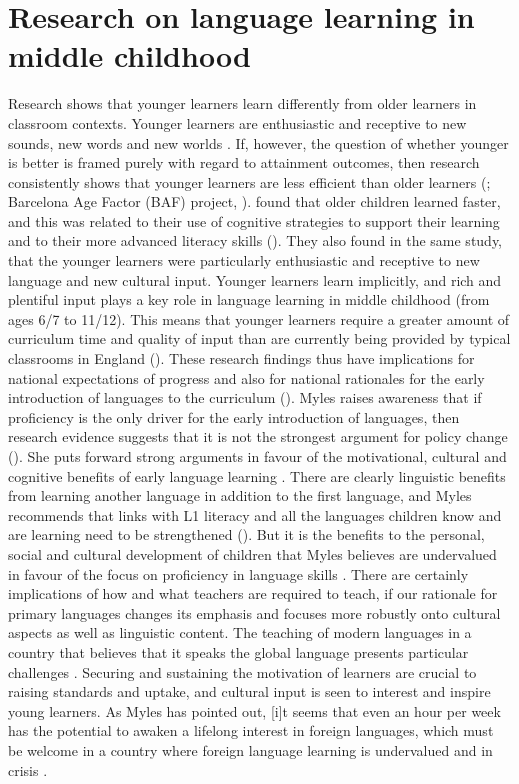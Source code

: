 \documentclass[output=paper]{langscibook}
\begin{document}
\section{Research on language learning in middle childhood}
\begin{sloppypar}
Research shows that younger learners learn differently from older learners in classroom contexts. Younger learners are enthusiastic and receptive to new sounds, new words and new worlds \citep{Myles2017}. If, however, the question of whether younger is better is framed purely with regard to attainment outcomes, then research consistently shows that younger learners are less efficient than older learners (\citealt{MylesMitchell2012}; Barcelona Age Factor (BAF) project, \citealt{Munoz2006}). \citet{MylesMitchell2012} found that older children learned faster, and this was related to their use of cognitive strategies to support their learning and to their more advanced literacy skills (\citealt{MylesMitchell2012,Myles2017}). They also found in the same study, that the younger learners were particularly enthusiastic and receptive to new language and new cultural input. Younger learners learn implicitly, and rich and plentiful input plays a key role in language learning in middle childhood (from ages 6/7 to 11/12). This means that younger learners require a greater amount of curriculum time and quality of input than are currently being provided by typical classrooms in England (\citealt{HolmesMyles2019}). These research findings thus have implications for national expectations of progress and also for national rationales for the early introduction of languages to the curriculum (\citealt{MitchellMyles2019}). Myles raises awareness that if proficiency is the only driver for the early introduction of languages, then research evidence suggests that it is not the strongest argument for policy change (\citealt{Myles2017,MitchellMyles2019}). She puts forward strong arguments in favour of the motivational, cultural and cognitive benefits of early language learning \citep{Myles2020}. There are clearly linguistic benefits from learning another language in addition to the first language, and Myles recommends that links with L1 literacy and all the languages children know and are learning need to be strengthened (\citealt[10]{HolmesMyles2019}). But it is the benefits to the personal, social and cultural development of children that Myles believes are undervalued in favour of the focus on proficiency in language skills \citep{Myles2017}. There are certainly implications of how and what teachers are required to teach, if our rationale for primary languages changes its emphasis and focuses more robustly onto cultural aspects as well as linguistic content. The teaching of modern languages in a country that believes that it speaks the global language presents particular challenges \citep{PorterEtAl2020}. Securing and sustaining the motivation of learners are crucial to raising standards and uptake, and cultural input is seen to interest and inspire young learners. As Myles has pointed out, [i]t seems that even an hour per week has the potential to awaken a lifelong interest in foreign languages, which must be welcome in a country where foreign language learning is undervalued and in crisis \citep{Myles2017}.

\end{sloppypar}
\end{document}
